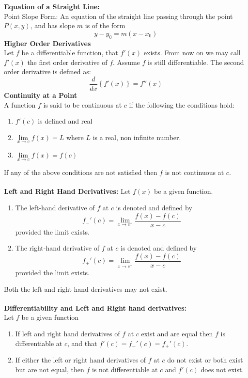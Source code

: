 \documentclass[14pt]{article}
\begin{document}
    \textbf{Equation of a Straight Line:}\\
    Point Slope Form: An equation of the straight line passing through the point $P(x,y)$, and has slope $m$ is of the form $$y-y_0=m(x-x_0)$$
    \textbf{Higher Order Derivatives}\\
    Let $f$ be a differentiable function, that $f'(x)$ exists. From now on we may call $f'(x)$ the first order derivative of $f$. Assume $f$ is still differentiable. The second order derivative is defined as: $$\frac{d}{dx}\left\{f'(x)\right\}=f''(x)$$
    \textbf{Continuity at a Point}\\
    A function $f$ is said to be continuous at $c$ if the following the conditions hold: 
    \begin{enumerate}
        \item $f'(c)$ is defined and real
        \item $\lim \limits_{x\rightarrow c} f(x)=L$ where $L$ is a real, non infinite number.
        \item $\lim \limits_{x\rightarrow c} f(x)=f(c)$
    \end{enumerate}
    If any of the above conditions are not satisfied then $f$ is not continuous at $c$.\\\\
    \textbf{Left and Right Hand Derivatives:}
    Let $f(x)$ be a given function.
    \begin{enumerate}
        \item The left-hand derivative of $f$ at $c$ is denoted and defined by $$f_-'(c)=\lim \limits_{x\rightarrow c^-} \frac{f(x)-f(c)}{x-c}$$ provided the limit exists.
        \item The right-hand derivative of $f$ at $c$ is denoted and defined by $$f_+'(c)=\lim \limits_{x\rightarrow c^+} \frac{f(x)-f(c)}{x-c}$$ provided the limit exists.
    \end{enumerate}Both the left and right hand derivatives may not exist.\\\\
    \textbf{Differentiability and Left and Right hand derivatives:}\\
    Let $f$ be a given function
    \begin{enumerate}
        \item If left and right hand derivatives of $f$ at $c$ exist and are equal then $f$ is differentiable at $c$, and that $f'(c)=f_-'(c)=f_+'(c)$.
        \item If either the left or right hand derivatives of $f$ at $c$ do not exist or both exist but are not equal, then $f$ is not differentiable at $c$ and $f'(c)$ does not exist.
    \end{enumerate}
\end{document}
